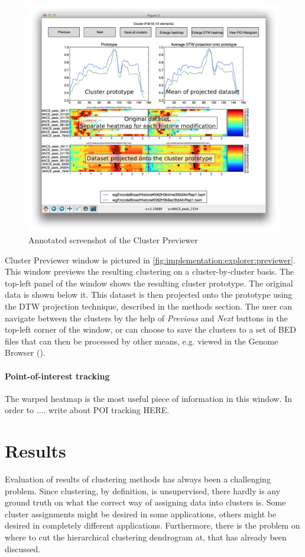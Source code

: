\documentclass[parskip]{cs4rep}
\begin{document}
\begin{figure}[p]
    \centering
    \includegraphics[height=0.45\textheight]{figures/implementation/explorer/previewer-window.png}
    \caption{Annotated screenshot of the Cluster Previewer}
    \label{fig:implementation:explorer:previewer}
\end{figure}
 
Cluster Previewer window is pictured in \autoref{fig:implementation:explorer:previewer}.
This window previews the resulting clustering on a cluster-by-cluster basis. The top-left panel of the window shows the resulting cluster prototype. The original data is shown below it. This dataset is then projected onto the prototype using the DTW projection technique, described in the methods section. The user can navigate between the clusters by the help of \emph{Previous} and \emph{Next} buttons in the top-left corner of the window, or can choose to save the clusters to a set of BED files that can then be processed by other means, e.g. viewed in the Genome Browser (\cite{Kent:2002wd}).

\subsubsection{Point-of-interest tracking}
The warped heatmap is the most useful piece of information in this window. 
In order to .... write about POI tracking HERE. 

\chapter{Results}
Evaluation of results of clustering methods has always been a challenging problem. Since clustering, by definition, is unsupervised, there hardly is any ground truth on what the correct way of assigning data into clusters is. Some cluster assignments might be desired in some applications, others might be desired in completely different applications. Furthermore, there is the problem on where to cut the hierarchical clustering dendrogram at, that has already been discussed.
\end{document}
